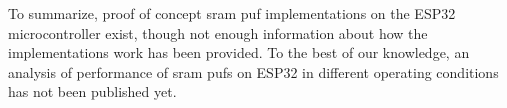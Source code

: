 To summarize, proof of concept \gls{sram} \gls{puf} implementations on the ESP32 microcontroller exist, though not enough information about how the implementations work has been provided. To the best of our knowledge, an analysis of performance of \gls{sram} \glspl{puf} on ESP32 in different operating conditions has not been published yet.

